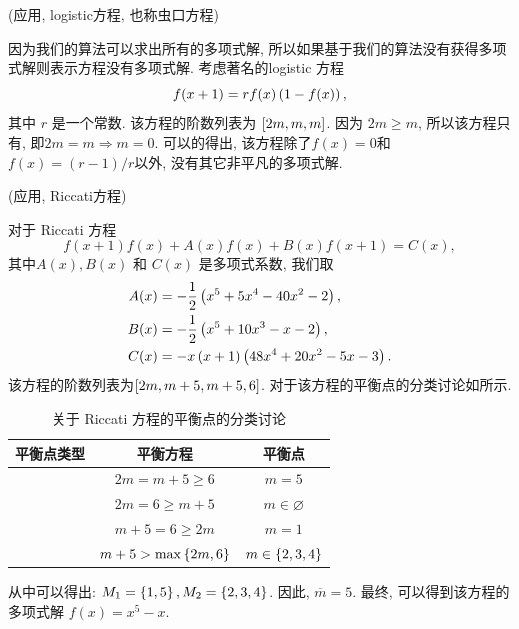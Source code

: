 \begin{example}
(应用, logistic方程, 也称虫口方程)

因为我们的算法可以求出所有的多项式解, 所以如果基于我们的算法没有获得多项式解则表示方程没有多项式解. 考虑著名的logistic 方程\cite{may1976simple}
\begin{equation}
    f(x+1)=r f(x)\left(1-f(x)\right),
\end{equation}
其中 $r$ 是一个常数. 该方程的阶数列表为 $\left[2m,m,m\right]$. 因为 $2m\ge m$, 所以该方程只有\BPone{}, 即$2m=m\Rightarrow m=0$. 可以的得出, 该方程除了$f(x)=0$和$f(x)=(r-1)/r$以外, 没有其它非平凡的多项式解.
\end{example}

\begin{example}
(应用, Riccati方程)

对于 Riccati 方程\cite{bittanti2012riccati}
\begin{equation}
    f(x+1)f(x)+A(x)f(x)+B(x)f(x+1)=C(x), \label{raeq}
\end{equation} 
其中$A(x),B(x)$ 和 $C(x)$ 是多项式系数, 我们取 
\begin{equation}
\begin{aligned}
A(x)&= -\frac{1}{2}\left(x^5+5x^4-40x^2-2\right), \\ 
B(x)&= -\frac{1}{2}\left(x^5+10x^3-x-2\right), \\ 
C(x)&= -x\left(x+1\right)\left(48x^4+20x^2-5x-3\right).
\end{aligned}
\end{equation}
该方程的阶数列表为$\left[2m,m+5,m+5,6\right]$. 对于该方程的平衡点的分类讨论如所示.

\begin{table}[htbp]
\centering
\caption{关于 Riccati 方程的平衡点的分类讨论}\label{tb}
\begin{tabular}{ccc}
\hline
平衡点类型 & 平衡方程 & 平衡点  \\ 
\hline
\BPone{}  & $2m=m+5\ge 6$            & $m=5$             \\ 
\BPone{}  & $2m=6\ge m+5$            & $m\in \varnothing$             \\ 
\BPone{}  & $m+5=6\ge 2m$            & $m=1$             \\ 
\BPtwo{}  & $m+5>\max\left\{2m,6\right\}$  & $m\in \left\{2,3,4\right\}$ \\
\hline
\end{tabular}
\end{table}
从中可以得出: $M_1=\left\{1,5\right\},M_2=\left\{2,3,4\right\}$. 因此, $\overline m=5$. 最终, 可以得到该方程的多项式解 $f(x)=x^5-x$. 


\end{example}
